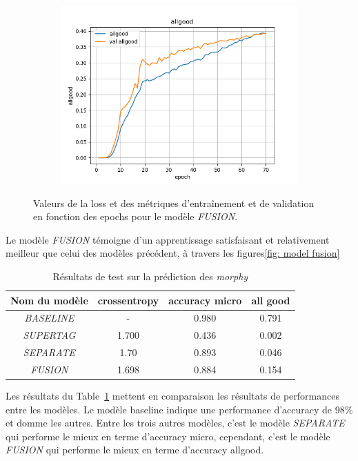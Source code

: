 \documentclass[a4paper]{article}
\begin{document}
\begin{figure}[H]
\begin{subfigure}{0.32\textwidth}
        \includegraphics[width=\linewidth]{../logs/fusion/allgood.png}
    \end{subfigure}
    \caption{Valeurs de la loss et des métriques d'entraînement et de validation en fonction des epochs 
            pour le modèle \textit{FUSION}.}
    \label{fig: results fusion}
\end{figure}

Le modèle \textit{FUSION} témoigne d'un apprentissage satisfaisant et relativement meilleur que celui des modèles précédent, à travers les figures\ref{fig: model fusion}


\begin{table}[H]
    \centering
    \begin{tabular}{|c|c|c|c|}
        \hline
         Nom du modèle & crossentropy & accuracy micro & all good\\
         \hline
         \textit{BASELINE}& - & 0.980 & 0.791 \\
         \hline
         \textit{SUPERTAG}& 1.700 & 0.436 & 0.002\\
         \hline
         \textit{SEPARATE}& 1.70 & 0.893 & 0.046\\
         \hline
         \textit{FUSION}& 1.698 & 0.884 & 0.154 \\
         \hline
    \end{tabular}
    \caption{Résultats de test sur la prédiction des \textit{morphy}}
    \label{tab: test morphy}
\end{table}

Les résultats du Table~\ref{tab: test morphy} mettent en comparaison les résultats de performances entre les modèles.
Le modèle baseline indique une performance d'accuracy de 98\% et domme les autres.
Entre les trois autres modèles, c'est le modèle \textit{SEPARATE} qui performe le mieux en terme d'accuracy micro, cependant,
c'est le modèle \textit{FUSION} qui performe le mieux en terme d'accuracy allgood. 
\end{document}
